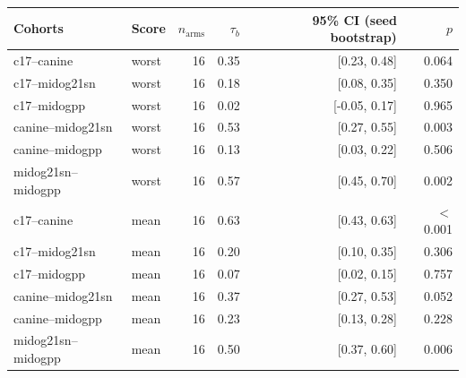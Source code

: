 \begin{tabular}{llrrrr}
\toprule
Cohorts & Score & $n_\text{arms}$ & $\tau_b$ & 95\% CI (seed bootstrap) & $p$ \\
\midrule
c17--canine & worst & 16 & 0.35 & [0.23, 0.48] & 0.064 \\
c17--midog21sn & worst & 16 & 0.18 & [0.08, 0.35] & 0.350 \\
c17--midogpp & worst & 16 & 0.02 & [-0.05, 0.17] & 0.965 \\
canine--midog21sn & worst & 16 & 0.53 & [0.27, 0.55] & 0.003 \\
canine--midogpp & worst & 16 & 0.13 & [0.03, 0.22] & 0.506 \\
midog21sn--midogpp & worst & 16 & 0.57 & [0.45, 0.70] & 0.002 \\
c17--canine & mean & 16 & 0.63 & [0.43, 0.63] & $<$0.001 \\
c17--midog21sn & mean & 16 & 0.20 & [0.10, 0.35] & 0.306 \\
c17--midogpp & mean & 16 & 0.07 & [0.02, 0.15] & 0.757 \\
canine--midog21sn & mean & 16 & 0.37 & [0.27, 0.53] & 0.052 \\
canine--midogpp & mean & 16 & 0.23 & [0.13, 0.28] & 0.228 \\
midog21sn--midogpp & mean & 16 & 0.50 & [0.37, 0.60] & 0.006 \\
\bottomrule
\end{tabular}
